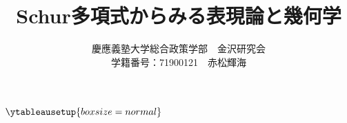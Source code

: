 \documentclass{ltjsreport}
\title{Schur多項式からみる表現論と幾何学}
\author{慶應義塾大学総合政策学部　金沢研究会\\学籍番号：71900121　赤松輝海}
\date{}
\begin{document}
\maketitle

\newpage


\tableofcontents
\newpage


\newpage


\newpage


\newpage
\appendix
$\ytableausetup{boxsize=normal}$



\newpage

\end{document}
